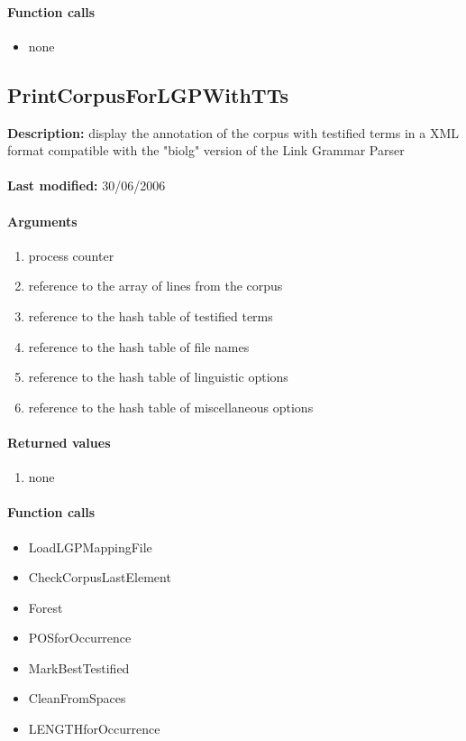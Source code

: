 \paragraph{Function calls}
\begin{itemize}
\item none
\end{itemize}

\subsection{PrintCorpusForLGPWithTTs}
\textbf{Description:} display the annotation of the corpus with testified terms in a XML format compatible with the "biolg" version of the Link Grammar Parser\\
\\\textbf{Last modified:} 30/06/2006

\paragraph{Arguments}
\begin{enumerate}
\item process counter
\item reference to the array of lines from the corpus
\item reference to the hash table of testified terms
\item reference to the hash table of file names
\item reference to the hash table of linguistic options
\item reference to the hash table of miscellaneous options
\end{enumerate}

\paragraph{Returned values}
\begin{enumerate}
\item none
\end{enumerate}

\paragraph{Function calls}
\begin{itemize}
\item LoadLGPMappingFile
\item CheckCorpusLastElement
\item Forest
\item POSforOccurrence
\item MarkBestTestified
\item CleanFromSpaces
\item LENGTHforOccurrence
\end{itemize}

